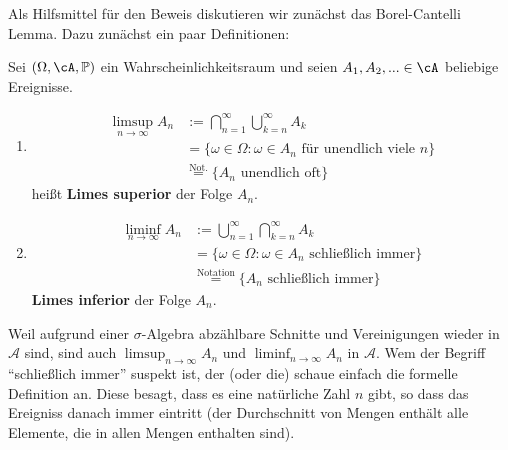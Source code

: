 \marginpar{\textcolor{red}{Vorlesung 26}}
	
Als Hilfsmittel f\"ur den Beweis diskutieren wir zun\"achst das Borel-Cantelli Lemma. Dazu zun\"achst ein paar Definitionen:	
\begin{deff}
	Sei $(\Omega, \cA, \mathbb{P})$ ein Wahrscheinlichkeitsraum und seien $A_1,A_2,... \in \cA$ beliebige Ereignisse.
	\begin{enumerate}[label=(\roman*)]
		\item \begin{align*}
			\limsup\limits_{n \to \infty} A_n 
			&:= \bigcap_{n=1}^{\infty} \bigcup_{k=n}^{\infty} A_k\\
			&= \{ \omega \in \Omega\colon \omega \in A_n \text{ für unendlich viele } n \}\\ 
			&\overset{\text{Not.}}{=} \{ A_n \text{ unendlich oft} \} 
		\end{align*}
		heißt \textbf{Limes superior} der Folge $A_n$.
		\item \begin{align*}
			\liminf\limits_{n \to \infty} A_n 
			&:= \bigcup_{n=1}^{\infty} \bigcap_{k=n}^{\infty} A_k\\
			&= \{ \omega \in \Omega\colon \omega \in A_n \text{ schließlich immer} \}\\
			&\overset{\text{Notation}}{=} \{ A_n \text{ schließlich immer} \}
		\end{align*}
		\textbf{Limes inferior} der Folge $A_n$.
	\end{enumerate}
\end{deff}
Weil aufgrund einer $\sigma$-Algebra abz\"ahlbare Schnitte und Vereinigungen wieder in $\mathcal A$ sind, sind auch $\limsup_{n\to\infty} A_n$ und $\liminf_{n\to\infty} A_n$ in $\mathcal A$. Wem der Begriff \enquote{schlie\ss lich immer} suspekt ist, der (oder die) schaue einfach die formelle Definition an. Diese besagt, dass es eine nat\"urliche Zahl $n$ gibt, so dass das Ereigniss danach immer eintritt (der Durchschnitt von Mengen enth\"alt alle Elemente, die in allen Mengen enthalten sind).\smallskip

